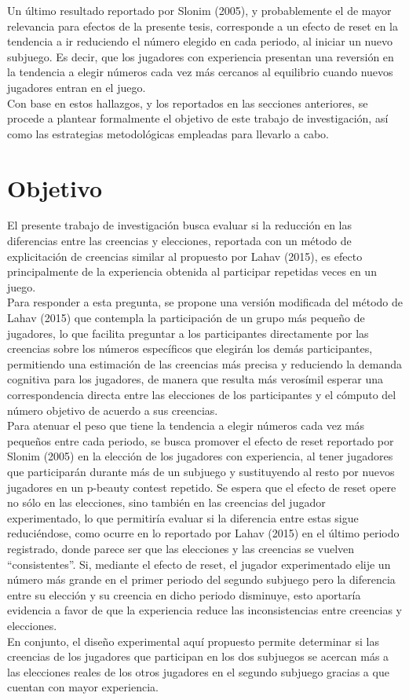 Un último resultado reportado por Slonim (2005), y probablemente el de mayor relevancia para efectos de la presente tesis, corresponde a un efecto de reset en la tendencia a ir reduciendo el número elegido en cada periodo, al iniciar un nuevo subjuego. Es decir, que los jugadores con experiencia presentan una reversión en la tendencia a elegir números cada vez más cercanos al equilibrio cuando nuevos jugadores entran en el juego.\\

Con base en estos hallazgos, y los reportados en las secciones anteriores, se procede a plantear formalmente el objetivo de este trabajo de investigación, así como las estrategias metodológicas empleadas para llevarlo a cabo. \\

\section{Objetivo}

El presente trabajo de investigación busca evaluar si la reducción en las diferencias entre las creencias y elecciones, reportada con un método de explicitación de creencias similar al propuesto por Lahav (2015), es efecto principalmente de la experiencia obtenida al participar repetidas veces en un juego.\\

Para responder a esta pregunta, se propone una versión modificada del método de Lahav (2015) que contempla la participación de un grupo más pequeño de jugadores, lo que facilita preguntar a los participantes directamente por las creencias sobre los números específicos que elegirán los demás participantes, permitiendo una estimación de las creencias más precisa y reduciendo la demanda cognitiva para los jugadores, de manera que resulta más verosímil esperar una correspondencia directa entre las elecciones de los participantes y el cómputo del número objetivo de acuerdo a sus creencias.\\

Para atenuar el peso que tiene la tendencia a elegir números cada vez más pequeños entre cada periodo, se busca promover el efecto de reset reportado por Slonim (2005) en la elección de los jugadores con experiencia, al tener jugadores que participarán durante más de un subjuego y sustituyendo al resto por nuevos jugadores en un p-beauty contest repetido. Se espera que el efecto de reset opere no sólo en las elecciones, sino también en las creencias del jugador experimentado, lo que permitiría evaluar si la diferencia entre estas sigue reduciéndose, como ocurre en lo reportado por Lahav (2015) en el último periodo registrado, donde parece ser que las elecciones y las creencias se vuelven “consistentes”. Si, mediante el efecto de reset, el jugador experimentado elije un número más grande en el primer periodo del segundo subjuego pero la diferencia entre su elección y su creencia en dicho periodo disminuye, esto aportaría evidencia a favor de que la experiencia reduce las inconsistencias entre creencias y elecciones.\\

En conjunto, el diseño experimental aquí propuesto permite determinar si las creencias de los jugadores que participan en los dos subjuegos se acercan más a las elecciones reales de los otros jugadores en el segundo subjuego gracias a que cuentan con mayor experiencia.\\

